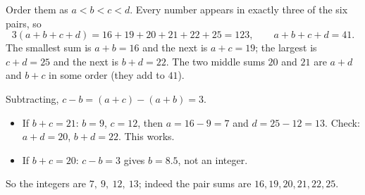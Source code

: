 Order them as $a<b<c<d$. Every number appears in exactly three of the six pairs, so
\[
3(a+b+c+d)=16+19+20+21+22+25=123,\qquad a+b+c+d=41 .
\]
The smallest sum is $a+b=16$ and the next is $a+c=19$; the largest is $c+d=25$ and the next is $b+d=22$. The two middle sums $20$ and $21$ are $a+d$ and $b+c$ in some order (they add to $41$).

Subtracting, $c-b=(a+c)-(a+b)=3$.
\begin{itemize}
\item If $b+c=21$: $b=9$, $c=12$, then $a=16-9=7$ and $d=25-12=13$. Check: $a+d=20$, $b+d=22$. This works.
\item If $b+c=20$: $c-b=3$ gives $b=8.5$, not an integer.
\end{itemize}
So the integers are $\boxed{7,\ 9,\ 12,\ 13}$; indeed the pair sums are $16,19,20,21,22,25$.
